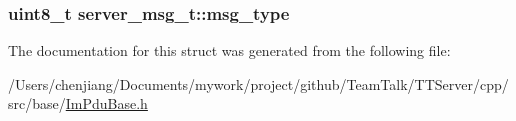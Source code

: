 \subsubsection[{msg\+\_\+type}]{\setlength{\rightskip}{0pt plus 5cm}uint8\+\_\+t server\+\_\+msg\+\_\+t\+::msg\+\_\+type}\label{structserver__msg__t_a29330a0fb497550f5b9beea73dbeaeaa}


The documentation for this struct was generated from the following file\+:\begin{DoxyCompactItemize}
\item 
/\+Users/chenjiang/\+Documents/mywork/project/github/\+Team\+Talk/\+T\+T\+Server/cpp/src/base/\hyperlink{_im_pdu_base_8h}{Im\+Pdu\+Base.\+h}\end{DoxyCompactItemize}
